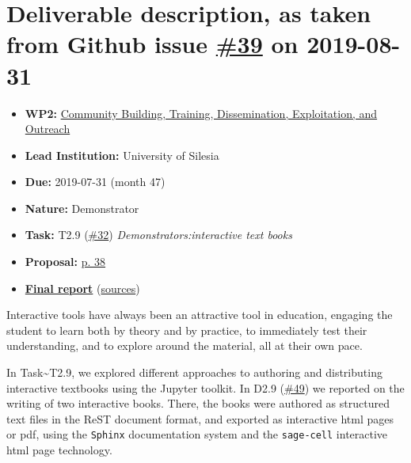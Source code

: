 \hypertarget{deliverable-description-as-taken-from-github-issue-39-on-2019-08-31}{%
\section*{\texorpdfstring{Deliverable description, as taken from Github
issue
\href{https://github.com/OpenDreamKit/OpenDreamKit/issues/39}{\#39} on
2019-08-31}{Deliverable description, as taken from Github issue \#39 on 2019-08-31}}\label{deliverable-description-as-taken-from-github-issue-39-on-2019-08-31}}

\begin{itemize}
\tightlist
\item
  \textbf{WP2:}
  \href{https://github.com/OpenDreamKit/OpenDreamKit/tree/master/WP2}{Community
  Building, Training, Dissemination, Exploitation, and Outreach}
\item
  \textbf{Lead Institution:} University of Silesia
\item
  \textbf{Due:} 2019-07-31 (month 47)
\item
  \textbf{Nature:} Demonstrator
\item
  \textbf{Task:} T2.9
  (\href{https://github.com/OpenDreamKit/OpenDreamKit/issues/32}{\#32})
  \emph{Demonstrators:interactive text books}
\item
  \textbf{Proposal:}
  \href{https://github.com/OpenDreamKit/OpenDreamKit/raw/master/Proposal/proposal-www.pdf}{p.
  38}
\item
  \textbf{\href{https://github.com/OpenDreamKit/OpenDreamKit/raw/master/WP2/D2.14/report-final.pdf}{Final
  report}}
  (\href{https://github.com/OpenDreamKit/OpenDreamKit/raw/master/WP2/D2.14/}{sources})
\end{itemize}

Interactive tools have always been an attractive tool in education,
engaging the student to learn both by theory and by practice, to
immediately test their understanding, and to explore around the
material, all at their own pace.

In Task\textasciitilde T2.9, we explored different approaches to
authoring and distributing interactive textbooks using the Jupyter
toolkit. In D2.9
(\href{https://github.com/OpenDreamKit/OpenDreamKit/issues/49}{\#49}) we
reported on the writing of two interactive books. There, the books were
authored as structured text files in the ReST document format, and
exported as interactive html pages or pdf, using the \texttt{Sphinx}
documentation system and the \texttt{sage-cell} interactive html page
technology.

